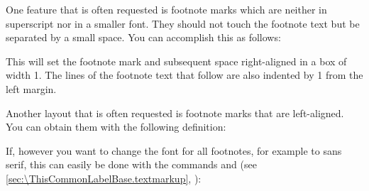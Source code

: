 \IfThisCommonFirstRun{\iftrue}{\csname iffalse\endcsname}%
  \begin{Example}
    One feature that is often requested is footnote marks
    which are neither in superscript nor in a smaller font. They should not
    touch the footnote text but be separated by a small space. You can
    accomplish this as follows:
\begin{lstcode}
\end{lstcode}
    This will set the footnote mark and subsequent space right-aligned in a 
    box of width 1. The lines of the footnote text that follow are 
    also indented by 1 from the left margin.

    Another layout that is often requested is footnote marks
    that are left-aligned. You can obtain them with the following
    definition:
\begin{lstcode}
\end{lstcode}
  
    If, however you want to change the font for all footnotes, for example
    to sans serif, this can easily be done with the commands
     and
     (see
    \autoref{sec:\ThisCommonLabelBase.textmarkup},
    ):
\begin{lstcode}
\end{lstcode}
  \end{Example}%
\fi%
%
%
\EndIndexGroup
\EndIndexGroup

